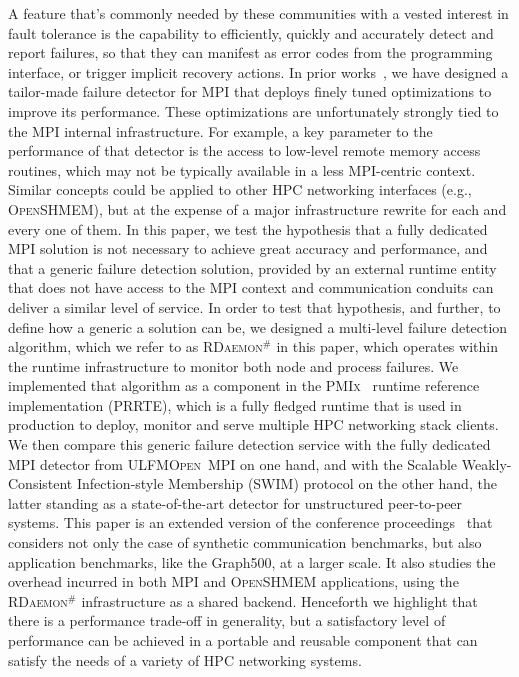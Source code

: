 \documentclass[5p,times,twocolumn]{elsarticle}
\newcommand{\prrte}[0]{\textsc{PRRTE}\xspace}
\newcommand{\pmix}[0]{\textsc{PMIx}\xspace}
\newcommand{\ompi}[0]{\textsc{Open~MPI}\xspace}
\newcommand{\ulfm}[0]{\textsc{ULFM}\xspace}
\newcommand{\mpi}[0]{\textsc{MPI}\xspace}
\newcommand{\oshmem}[0]{\textsc{OpenSHMEM}\xspace}
\newcommand{\ourwork}[0]{\textsc{RDaemon}\ensuremath{^\#}\xspace}
\begin{document}
A feature that's commonly needed by these communities with a vested
interest in fault tolerance is the capability to efficiently, quickly and
accurately detect and report failures, so that they can manifest as
error codes from the programming interface, or trigger implicit recovery
actions. In prior works~\cite{George16}, we have designed a tailor-made
failure detector for \mpi that deploys finely tuned optimizations to
improve its performance. These optimizations are unfortunately strongly
tied to the \mpi internal infrastructure. For example, a key parameter to
the performance of that detector is the
access to low-level remote memory access routines, which may not be typically
available in a less \mpi-centric context. Similar concepts could be
applied to other HPC networking interfaces (e.g., \oshmem), but at
the expense of a major infrastructure rewrite for each and every one of
them. In this paper, we test the hypothesis that a fully dedicated \mpi
solution is not necessary to achieve great accuracy and performance, and
that a generic failure detection solution, provided by an external runtime
entity that does not have access to the \mpi context and communication conduits
can deliver a similar level of service. In order to test that hypothesis,
and further, to define how a generic a solution can be, we designed
a multi-level failure detection algorithm, which we refer to as
\ourwork in this paper, which operates
within the runtime infrastructure to monitor both node and process
failures. We implemented that algorithm as a component in the \pmix~\cite{CASTAIN18} runtime reference implementation (\prrte), which is a fully fledged runtime that is
used in production to deploy, monitor and
serve multiple HPC networking stack clients.
We then compare this generic
failure detection service with the fully dedicated \mpi detector from
\ulfm \ompi on one hand, and with the Scalable Weakly-Consistent Infection-style Membership (SWIM) protocol on the other hand, the latter standing
as a state-of-the-art detector for unstructured peer-to-peer systems. 
%
This paper is an extended version of the conference proceedings~\cite{Zhong:2019:RLF:3343211.3343225} that considers not only the case of synthetic communication benchmarks, but also application benchmarks, like the Graph500, at a larger scale. It also studies the overhead incurred in both \mpi and \oshmem applications, using the \ourwork infrastructure as a shared backend.
%
Henceforth
we highlight that there is a performance trade-off in generality, but a
satisfactory level of performance can be achieved in a portable and reusable
component that can satisfy the needs of a variety of HPC networking systems.
\end{document}
